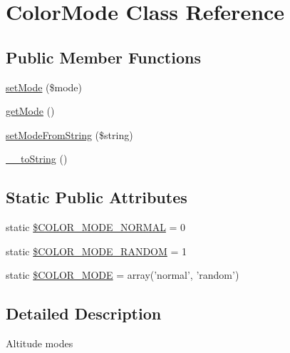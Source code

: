\hypertarget{classColorMode}{
\section{ColorMode Class Reference}
\label{dd/ddb/classColorMode}
}
\subsection*{Public Member Functions}
\begin{DoxyCompactItemize}
\item 
\hyperlink{classColorMode_aa489b32aae03c3724f07d61290227a9f}{setMode} (\$mode)
\item 
\hyperlink{classColorMode_a92b9346fded9693d44d0274b12b9f6da}{getMode} ()
\item 
\hyperlink{classColorMode_aa348e036571da3c309ae5625ce8a8dd0}{setModeFromString} (\$string)
\item 
\hyperlink{classColorMode_ae1fa296b0410d66580ba2fa0c80736e7}{\_\-\_\-toString} ()
\end{DoxyCompactItemize}
\subsection*{Static Public Attributes}
\begin{DoxyCompactItemize}
\item 
static \hyperlink{classColorMode_a3e032493d1742989a92dfa3df5f28127}{\$COLOR\_\-MODE\_\-NORMAL} = 0
\item 
static \hyperlink{classColorMode_a78b67383edbb9de9301531fd83beda62}{\$COLOR\_\-MODE\_\-RANDOM} = 1
\item 
static \hyperlink{classColorMode_a1022ad43521d4bee933f34845b0cd564}{\$COLOR\_\-MODE} = array('normal', 'random')
\end{DoxyCompactItemize}


\subsection{Detailed Description}
Altitude modes 

